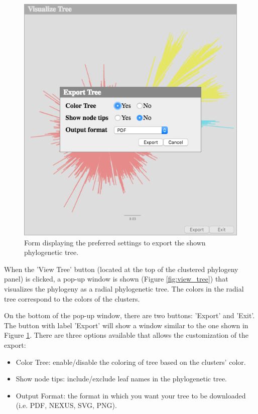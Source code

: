 \documentclass[a4paper, 11pt]{article} %
\begin{document}
\begin{figure}[H]
\centering
\includegraphics[scale=0.50]{images/export_tree.PNG}
\vspace{-0.25cm}
\caption{Form displaying the preferred settings to export the shown phylogenetic tree.}
\label{fig:export_tree}
\end{figure}

When the 'View Tree' button (located at the top of the clustered phylogeny panel) is clicked, a pop-up window is shown (Figure \ref{fig:view_tree}) that visualizes the phylogeny as a radial phylogenetic tree. 
The colors in the radial tree correspond to the colors of the clusters.

\break
\break
On the bottom of the pop-up window, there are two buttons: 'Export' and 'Exit'.
The button with label 'Export' will show a window similar to the one shown in Figure \ref{fig:export_tree}. There are three options available that allows the customization of the export:
\begin{itemize}
\item Color Tree: enable/disable the coloring of tree based on the clusters' color.

\item Show node tips: include/exclude leaf names in the phylogenetic tree.
\item Output Format: the format in which you want your tree to be downloaded (i.e. PDF, NEXUS, SVG, PNG).
\end{itemize}
  
\end{document}
